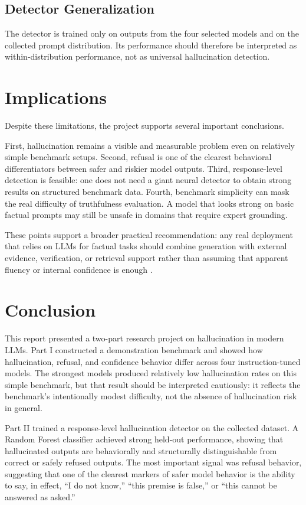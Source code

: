 \documentclass[11pt]{article}
\begin{document}
\subsection{Detector Generalization}
The detector is trained only on outputs from the four selected models and on the collected prompt distribution. Its performance should therefore be interpreted as within-distribution performance, not as universal hallucination detection.

\section{Implications}
Despite these limitations, the project supports several important conclusions.

First, hallucination remains a visible and measurable problem even on relatively simple benchmark setups. Second, refusal is one of the clearest behavioral differentiators between safer and riskier model outputs. Third, response-level detection is feasible: one does not need a giant neural detector to obtain strong results on structured benchmark data. Fourth, benchmark simplicity can mask the real difficulty of truthfulness evaluation. A model that looks strong on basic factual prompts may still be unsafe in domains that require expert grounding.

These points support a broader practical recommendation: any real deployment that relies on LLMs for factual tasks should combine generation with external evidence, verification, or retrieval support rather than assuming that apparent fluency or internal confidence is enough \cite{bechard2024rag, zhang2025ragreview}.

\newpage
\section{Conclusion}
This report presented a two-part research project on hallucination in modern LLMs. Part I constructed a demonstration benchmark and showed how hallucination, refusal, and confidence behavior differ across four instruction-tuned models. The strongest models produced relatively low hallucination rates on this simple benchmark, but that result should be interpreted cautiously: it reflects the benchmark's intentionally modest difficulty, not the absence of hallucination risk in general.

Part II trained a response-level hallucination detector on the collected dataset. A Random Forest classifier achieved strong held-out performance, showing that hallucinated outputs are behaviorally and structurally distinguishable from correct or safely refused outputs. The most important signal was refusal behavior, suggesting that one of the clearest markers of safer model behavior is the ability to say, in effect, ``I do not know,'' ``this premise is false,'' or ``this cannot be answered as asked.''
\end{document}
